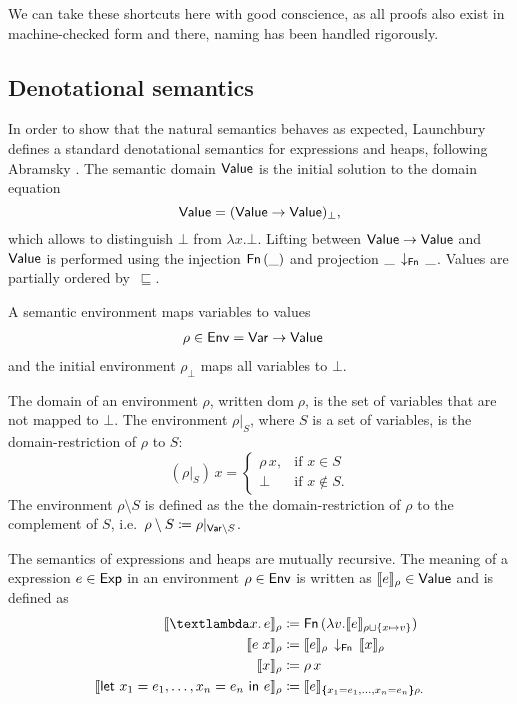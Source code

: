 \documentclass{jfp1}
\theoremstyle{nonumberbreak}
\newcommand{\sVar}  {\text{\textsf{Var}}}
\newcommand{\sExp}  {\text{\textsf{Exp}}}
\newcommand{\sValue}{\text{\textsf{Value}}}
\newcommand{\sEnv}  {\text{\textsf{Env}}}
\newcommand{\sFn}[1]{\text{\textsf{Fn}}\,(#1)}
\newcommand{\sFnProj}[2]{#1\,\downarrow_{\text{\textsf{Fn}}}\,#2}
\newcommand{\sApp}[2]{#1\;#2}
\newcommand{\sLam}[2]{\text{\textlambda} #1.\, #2}
\newcommand{\sLet}[2]{\text{\textsf{let}}\ #1\ \text{\textsf{in}}\ #2}
\newcommand{\dom}[1]{\text{dom}\;#1}
\newcommand{\xeng}{x_1 = e_1, \ldots, x_n = e_n}
\newcommand{\dsem}[2]{\llbracket #1 \rrbracket_{#2}}
\newcommand{\esem}[1]{\{\!\!\!\{#1\}\!\!\!\}}
\begin{document}
We can take these shortcuts here with good conscience, as all proofs also exist in machine-checked form and there, naming has been handled rigorously.

\subsection{Denotational semantics}

In order to show that the natural semantics behaves as expected, Launchbury defines a standard denotational semantics for expressions and heaps, following Abramsky . The semantic domain $\sValue$ is the initial solution to the domain equation 
\[
\sValue = (\sValue \to \sValue)_\bot,
\]
which allows to distinguish $\bot$ from $\lambda x. \bot$. Lifting between $\sValue \to \sValue$ and $\sValue$ is performed using the injection $\sFn \_$ and projection $\sFnProj{\_}{\_}$. Values are partially ordered by~$\sqsubseteq$.

A semantic environment maps variables to values
\begin{alignat*}{2}
\rho \in \sEnv &= \sVar \to \sValue
\end{alignat*}
and the initial environment $\rho_\bot$ maps all variables to $\bot$.

The domain of an environment $\rho$, written $\dom\rho$, is the set of variables that are not mapped to $\bot$.
The environment $\rho|_S$, where $S$ is a set of variables, is the domain-restriction of $\rho$ to $S$:
\[
(\rho |_S)\, x = 
\begin{cases}
\rho\, x,& \text{if } x \in S\\
\bot& \text{if } x \not\in S.
\end{cases}
\]
The environment $\rho\setminus S$ is defined as the the domain-restriction of $\rho$ to the complement of $S$, i.e.\ \mbox{$\rho\setminus S \coloneqq \rho|_{\sVar \setminus S}$}.

The semantics of expressions and heaps are mutually recursive. The meaning of a expression $e \in \sExp$ in an environment $\rho \in \sEnv$ is written as $\dsem e \rho \in \sValue$ and is defined as
\begin{align*}
\dsem{\sLam x e}\rho &\coloneqq \sFn{\lambda v. \dsem e {\rho \sqcup \{x \mapsto v\}}}\\
\dsem{\sApp e  x}\rho &\coloneqq \sFnProj {\dsem e \rho}{\dsem x \rho}\\
\dsem{x}\rho &\coloneqq \rho\,x\\
\dsem{\sLet{\xeng}e}\rho &\coloneqq \dsem e {\esem{\xeng}\rho.}
\end{align*}
\end{document}
